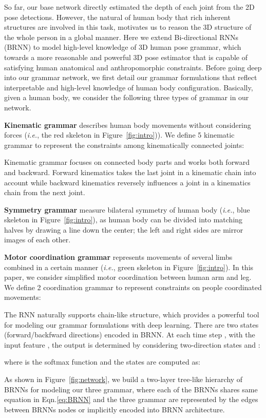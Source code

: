 \documentclass[letterpaper]{article} \usepackage{aaai18}  \usepackage{times}  \usepackage{helvet}  \usepackage{courier}  \usepackage{url}  \usepackage{color}
\begin{document}
So far, our base network directly estimated the depth of each joint from the 2D pose detections. However, the natural of human body that rich inherent structures are involved in this task, motivates us to reason the 3D structure of the whole person in a global manner. Here we extend Bi-directional RNNs (BRNN) to model high-level knowledge of 3D human pose grammar, which towards a more reasonable and powerful 3D pose estimator that is capable of satisfying human anatomical and anthropomorphic constraints. Before going deep into our grammar network, we first detail our grammar formulations that reflect interpretable and high-level knowledge of human body configuration. Basically, given a human body, we consider the following three types of grammar in our network.

\textbf{Kinematic grammar}  describes human body movements without considering forces (\textit{i.e.}, the red skeleton in Figure~\ref{fig:intro})). We define 5 kinematic grammar to represent the constraints among kinematically connected joints:

Kinematic grammar focuses on connected body parts and works both forward and backward. Forward kinematics takes the last joint in a kinematic chain into account while backward kinematics reversely influences a joint in a kinematics chain from the next joint.

\textbf{Symmetry grammar}  measure bilateral symmetry of human body (\textit{i.e.}, blue skeleton in Figure~\ref{fig:intro}), as human body can be divided into matching halves by drawing a line down the center; the left and right sides are mirror images of each other. 

\textbf{Motor coordination grammar}  represents movements of several limbs combined in a certain manner (\textit{i.e.}, green skeleton in Figure~\ref{fig:intro}). In this paper, we consider simplified motor coordination between human arm and leg. We define 2 coordination grammar to represent constraints on people coordinated movements:


The RNN naturally supports chain-like structure, which provides a powerful tool for modeling our grammar formulations with deep learning. There are two states (forward/backfward directions) encoded in BRNN. At each time step , with the input feature , the output  is determined by considering two-direction states  and :

where  is the softmax function and the states  are computed as:


As shown in Figure~\ref{fig:network}, we build a two-layer tree-like hierarchy of BRNNs for modeling our three grammar, where each of the BRNNs shares same equation in Eqn.\eqref{eq:BRNN} and the three grammar are represented by the edges between BRNNs nodes or implicitly encoded into BRNN architecture.
\end{document}
